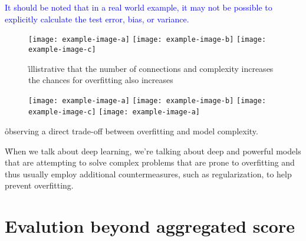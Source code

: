 \textcolor{blue}{It should be noted that in a real world example, it may not be possible to explicitly calculate the test error, bias, or variance.}



\begin{figure}[htp]
	\centering
	\texttt{[image: example-image-a]}\hfil
	\texttt{[image: example-image-b]}\hfil
	\texttt{[image: example-image-c]}\hfil
	\caption{ \r{illistrative that the number of connections and complexity increases the chances for overfitting also increases}}
	\label{fig:basics_eval_nodesinhidden}
\end{figure}


\begin{figure}[htp]
	\centering
	\texttt{[image: example-image-a]}\hfil
	\texttt{[image: example-image-b]}\hfil
	\texttt{[image: example-image-c]}\hfil
	\texttt{[image: example-image-a]}\hfil
	\caption{}
	\label{fig:basics_eval_numlayers}
\end{figure}

\r{observing a direct trade-off between overfitting and model complexity.}

\r{When we talk about deep learning, we're talking about deep and powerful models that are attempting to solve complex problems that are prone to overfitting and thus usually employ additional countermeasures, such as regularization, to help prevent overfitting.}



\section{Evalution beyond aggregated score}

